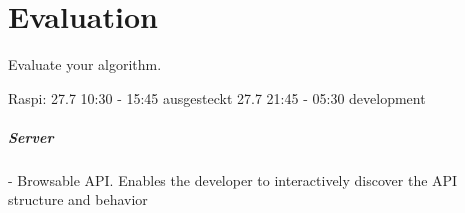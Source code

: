 \chapter{Evaluation}
\label{sec:evaluation}

Evaluate your algorithm.

Raspi: 27.7 10:30 - 15:45 ausgesteckt
27.7 21:45 - 05:30 development

\paragraph{Server}
- Browsable API. Enables the developer to interactively discover the API structure and behavior
